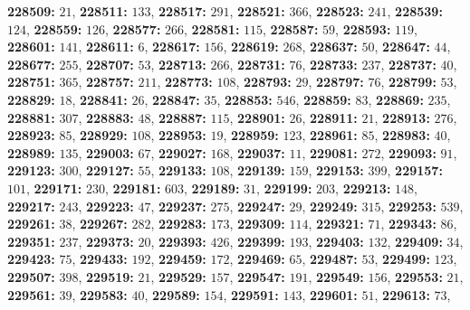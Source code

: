\textsf{\bfseries 228509:} $21$, \textsf{\bfseries 228511:} $133$, \textsf{\bfseries 228517:} $291$, \textsf{\bfseries 228521:} $366$, \textsf{\bfseries 228523:} $241$, \textsf{\bfseries 228539:} $124$, \textsf{\bfseries 228559:} $126$, \textsf{\bfseries 228577:} $266$, \textsf{\bfseries 228581:} $115$, \textsf{\bfseries 228587:} $59$, \textsf{\bfseries 228593:} $119$, \textsf{\bfseries 228601:} $141$, \textsf{\bfseries 228611:} $6$, \textsf{\bfseries 228617:} $156$, \textsf{\bfseries 228619:} $268$, \textsf{\bfseries 228637:} $50$, \textsf{\bfseries 228647:} $44$, \textsf{\bfseries 228677:} $255$, \textsf{\bfseries 228707:} $53$, \textsf{\bfseries 228713:} $266$, \textsf{\bfseries 228731:} $76$, \textsf{\bfseries 228733:} $237$, \textsf{\bfseries 228737:} $40$, \textsf{\bfseries 228751:} $365$, \textsf{\bfseries 228757:} $211$, \textsf{\bfseries 228773:} $108$, \textsf{\bfseries 228793:} $29$, \textsf{\bfseries 228797:} $76$, \textsf{\bfseries 228799:} $53$, \textsf{\bfseries 228829:} $18$, \textsf{\bfseries 228841:} $26$, \textsf{\bfseries 228847:} $35$, \textsf{\bfseries 228853:} $546$, \textsf{\bfseries 228859:} $83$, \textsf{\bfseries 228869:} $235$, \textsf{\bfseries 228881:} $307$, \textsf{\bfseries 228883:} $48$, \textsf{\bfseries 228887:} $115$, \textsf{\bfseries 228901:} $26$, \textsf{\bfseries 228911:} $21$, \textsf{\bfseries 228913:} $276$, \textsf{\bfseries 228923:} $85$, \textsf{\bfseries 228929:} $108$, \textsf{\bfseries 228953:} $19$, \textsf{\bfseries 228959:} $123$, \textsf{\bfseries 228961:} $85$, \textsf{\bfseries 228983:} $40$, \textsf{\bfseries 228989:} $135$, \textsf{\bfseries 229003:} $67$, \textsf{\bfseries 229027:} $168$, \textsf{\bfseries 229037:} $11$, \textsf{\bfseries 229081:} $272$, \textsf{\bfseries 229093:} $91$, \textsf{\bfseries 229123:} $300$, \textsf{\bfseries 229127:} $55$, \textsf{\bfseries 229133:} $108$, \textsf{\bfseries 229139:} $159$, \textsf{\bfseries 229153:} $399$, \textsf{\bfseries 229157:} $101$, \textsf{\bfseries 229171:} $230$, \textsf{\bfseries 229181:} $603$, \textsf{\bfseries 229189:} $31$, \textsf{\bfseries 229199:} $203$, \textsf{\bfseries 229213:} $148$, \textsf{\bfseries 229217:} $243$, \textsf{\bfseries 229223:} $47$, \textsf{\bfseries 229237:} $275$, \textsf{\bfseries 229247:} $29$, \textsf{\bfseries 229249:} $315$, \textsf{\bfseries 229253:} $539$, \textsf{\bfseries 229261:} $38$, \textsf{\bfseries 229267:} $282$, \textsf{\bfseries 229283:} $173$, \textsf{\bfseries 229309:} $114$, \textsf{\bfseries 229321:} $71$, \textsf{\bfseries 229343:} $86$, \textsf{\bfseries 229351:} $237$, \textsf{\bfseries 229373:} $20$, \textsf{\bfseries 229393:} $426$, \textsf{\bfseries 229399:} $193$, \textsf{\bfseries 229403:} $132$, \textsf{\bfseries 229409:} $34$, \textsf{\bfseries 229423:} $75$, \textsf{\bfseries 229433:} $192$, \textsf{\bfseries 229459:} $172$, \textsf{\bfseries 229469:} $65$, \textsf{\bfseries 229487:} $53$, \textsf{\bfseries 229499:} $123$, \textsf{\bfseries 229507:} $398$, \textsf{\bfseries 229519:} $21$, \textsf{\bfseries 229529:} $157$, \textsf{\bfseries 229547:} $191$, \textsf{\bfseries 229549:} $156$, \textsf{\bfseries 229553:} $21$, \textsf{\bfseries 229561:} $39$, \textsf{\bfseries 229583:} $40$, \textsf{\bfseries 229589:} $154$, \textsf{\bfseries 229591:} $143$, \textsf{\bfseries 229601:} $51$, \textsf{\bfseries 229613:} $73$, 
